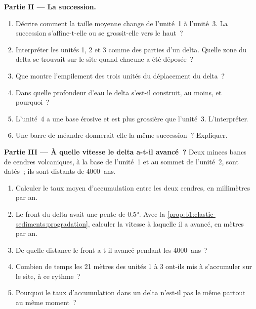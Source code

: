\begin{problem}
\medskip
\noindent\textbf{Partie II --- La succession.}
\begin{enumerate}[resume]
  \item Décrire comment la taille moyenne change de l'unité~1 à l'unité~3. La
        succession s'affine-t-elle ou se grossit-elle vers le haut~?
  \item Interpréter les unités 1, 2 et 3 comme des parties d'un delta. Quelle zone du delta
        se trouvait sur le site quand chacune a été déposée~?
  \item Que montre l'empilement des trois unités du déplacement du
        delta~?
  \item Dans quelle profondeur d'eau le delta s'est-il construit, au moins, et pourquoi~?
  \item L'unité~4 a une base érosive et est plus grossière que l'unité~3. L'interpréter.
  \item Une barre de méandre donnerait-elle la même succession~? Expliquer.
\end{enumerate}

\medskip
\noindent\textbf{Partie III --- À quelle vitesse le delta a-t-il avancé~?}
Deux minces bancs de cendres volcaniques, à la base de l'unité~1 et au sommet de
l'unité~2, sont datés~; ils sont distants de \num{4000}~ans.
\begin{enumerate}[resume]
  \item Calculer le taux moyen d'accumulation entre les deux cendres, en
        millimètres par an.
  \item Le front du delta avait une pente de \ang{0.5}. Avec la
        \cref{prop:b1:clastic-sediments:progradation}, calculer la vitesse à laquelle
        il a avancé, en mètres par an.
  \item De quelle distance le front a-t-il avancé pendant les \num{4000}~ans~?
  \item Combien de temps les 21 mètres des unités 1 à 3 ont-ils mis à s'accumuler sur le
        site, à ce rythme~?
  \item Pourquoi le taux d'accumulation dans un delta n'est-il pas le même partout au
        même moment~?
\end{enumerate}


\end{problem}
